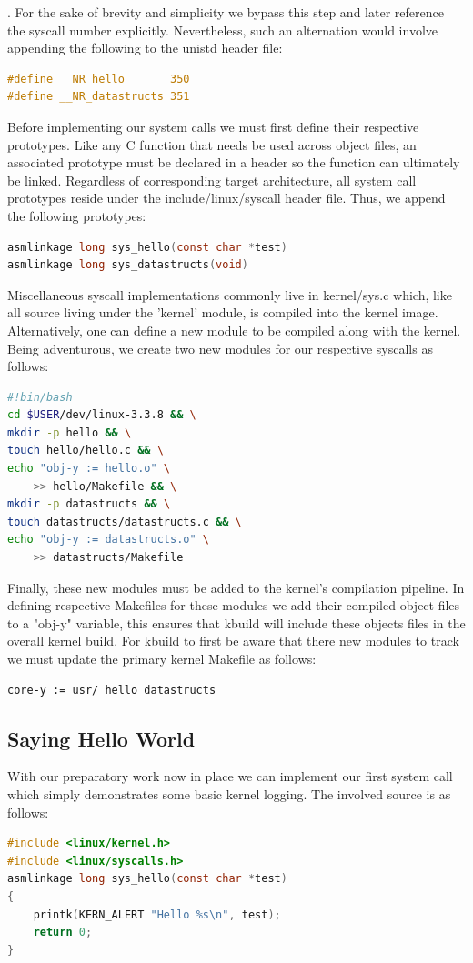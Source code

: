\documentclass{article}
\begin{document}
\citep{Love7}. 
For the sake of brevity and simplicity we bypass this step and later reference the syscall number explicitly.
Nevertheless, such an alternation would involve appending the following to the unistd header file:
\begin{lstlisting}[language=C]
#define __NR_hello       350
#define __NR_datastructs 351
\end{lstlisting}
Before implementing our system calls we must first define their respective
prototypes. Like any C function that needs be used across object files,
an associated prototype must be declared in a header so the
function can ultimately be linked. Regardless of corresponding target architecture, all
system call prototypes reside under the include/linux/syscall header file. Thus,
we append the following prototypes: 
\begin{lstlisting}[language=C]
asmlinkage long sys_hello(const char *test)
asmlinkage long sys_datastructs(void)
\end{lstlisting} 
Miscellaneous syscall implementations commonly live in kernel/sys\@.c which, like
all source living under the 'kernel' module, is compiled into the kernel image. Alternatively,
one can define a new module to be compiled along with the kernel.  Being adventurous, we create 
two new modules for our respective syscalls as follows:
\begin{lstlisting}[language=Bash]
#!bin/bash
cd $USER/dev/linux-3.3.8 && \
mkdir -p hello && \
touch hello/hello.c && \
echo "obj-y := hello.o" \
	>> hello/Makefile && \
mkdir -p datastructs && \
touch datastructs/datastructs.c && \
echo "obj-y := datastructs.o" \
	>> datastructs/Makefile
\end{lstlisting} 
Finally, these new modules must be added to the kernel's compilation pipeline. In defining respective
Makefiles for these modules we add their compiled object files to a "obj-y" variable, this ensures
that kbuild will include these objects files in the overall kernel build. For kbuild to first be aware that
there new modules to track we must update the primary kernel Makefile as follows:
\begin{lstlisting}[language=Bash]
core-y := usr/ hello datastructs
\end{lstlisting} 
  
\subsection{Saying Hello World}
With our preparatory work now in place we can implement our first system call which 
simply demonstrates some basic kernel logging. The involved source is as follows:
\begin{lstlisting}[language=C]
#include <linux/kernel.h>
#include <linux/syscalls.h>
asmlinkage long sys_hello(const char *test)
{
    printk(KERN_ALERT "Hello %s\n", test);	
    return 0;
}
\end{lstlisting} 
\end{document}
